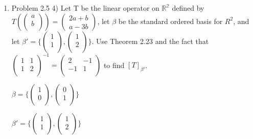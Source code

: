 \documentclass[12pt]{article}
\begin{document}
\begin{enumerate}
    \item Problem 2.5 4) Let T be the linear operator on $\mathbb{R^2}$ defined by $T(\begin{pmatrix}
        a\\
        b \\
    \end{pmatrix}) = \begin{pmatrix}
        2a + b \\
        a - 3b
    \end{pmatrix}$, let $\beta$ be the standard ordered basis for $R^2$, and let $\beta' = \{\begin{pmatrix}
        1\\
        1 \\
    \end{pmatrix}, \begin{pmatrix}
        1\\
        2 \\
    \end{pmatrix}\}$. Use Theorem 2.23 and the fact that $\begin{pmatrix}
        1 & 1\\
        1 & 2 \\
    \end{pmatrix}^{-1} = \begin{pmatrix}
        2 & -1\\
        -1 & 1 \\
    \end{pmatrix}$ 
    to find $[T]_{\beta'}$. 
    
    $\beta = \{\begin{pmatrix}
        1\\
        0 \\
    \end{pmatrix}, \begin{pmatrix}
        0\\
        1 \\
    \end{pmatrix}\}$

    $\beta' = \{\begin{pmatrix}
        1\\
        1 \\
    \end{pmatrix}, \begin{pmatrix}
        1\\
        2 \\
    \end{pmatrix}\}$


\end{enumerate}
\end{document}
